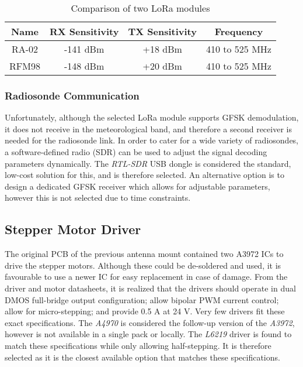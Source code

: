 \begin{table}[!htb]
  \centering
  \renewcommand{\arraystretch}{1.2}
  \begin{tabular}{ |c|c|c|c| }
  \hline
  \textbf{Name}   & \textbf{RX Sensitivity} & \textbf{TX Sensitivity}& \textbf{Frequency} \\
  \hline
  RA-02           & -141 dBm             & +18 dBm              & 410 to 525 MHz     \\
  RFM98           & -148 dBm             & +20 dBm              & 410 to 525 MHz     \\
  \hline
  \end{tabular}
  \caption{Comparison of two LoRa modules}
  \label{tab:rfModules}
\end{table}

\subsubsection{Radiosonde Communication}
Unfortunately, although the selected LoRa module supports GFSK demodulation, it does not receive in the meteorological band, and therefore a second receiver is needed for the radiosonde link. In order to cater for a wide variety of radiosondes, a software-defined radio (SDR) can be used to adjust the signal decoding parameters dynamically. The \textit{RTL-SDR} USB dongle is considered the standard, low-cost solution for this, and is therefore selected. An alternative option is to design a dedicated GFSK receiver which allows for adjustable parameters, however this is not selected due to time constraints.

\subsection{Stepper Motor Driver}
The original PCB of the previous antenna mount contained two A3972 ICs to drive the stepper motors. Although these could be de-soldered and used, it is favourable to use a newer IC for easy replacement in case of damage. From the driver and motor datasheets, it is realized that the drivers should operate in dual DMOS full-bridge output configuration; allow bipolar PWM current control; allow for micro-stepping; and provide 0.5 A at 24 V. Very few drivers fit these exact specifications. The \textit{A4970} is considered the follow-up version of the \textit{A3972}, however is not available in a single pack or locally. The \textit{L6219} driver is found to match these specifications while only allowing half-stepping. It is therefore selected as it is the closest available option that matches these specifications.

